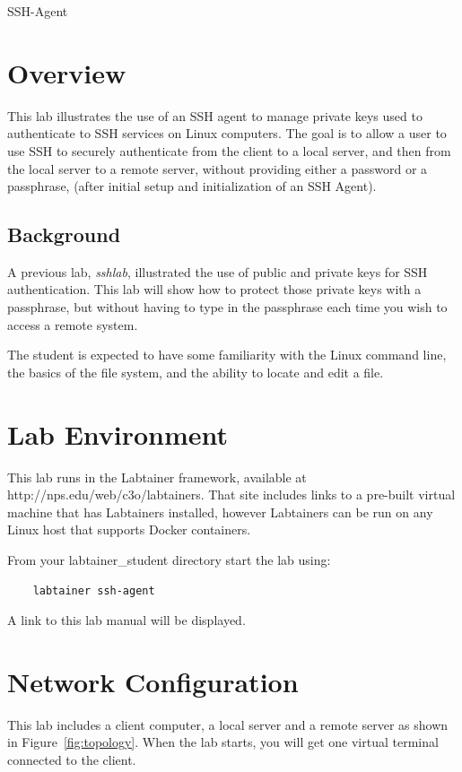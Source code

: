 


\begin{center}
{\LARGE SSH-Agent}
\vspace{0.1in}\\
\end{center}


\section{Overview}
This lab illustrates the use of an SSH agent to manage private keys used to
authenticate to SSH services on Linux computers.  The goal is to allow a user
to use SSH to securely authenticate from the client to a local server, and then from the
local server to a remote server, without providing either a password or a passphrase,
(after initial setup and initialization of an SSH Agent).

\subsection {Background}
A previous lab, \textit{sshlab},
illustrated the use of public and private keys for SSH authentication.  This lab
will show how to protect those private keys with a passphrase, but without having
to type in the passphrase each time you wish to access a remote system.

The student is expected to have some familiarity with the Linux command line,
the basics of the file system, and the ability to locate and edit a file.  

\section{Lab Environment}
This lab runs in the Labtainer framework,
available at http://nps.edu/web/c3o/labtainers.
That site includes links to a pre-built virtual machine
that has Labtainers installed, however Labtainers can
be run on any Linux host that supports Docker containers.

From your labtainer_student directory start the lab using:
\begin{verbatim}
    labtainer ssh-agent
\end{verbatim}
\noindent A link to this lab manual will be displayed.  


\section{Network Configuration}
This lab includes a client computer, a local server and
a remote server as shown in Figure~\ref{fig:topology}.
When the lab starts, you will get one virtual terminal connected 
to the client.


